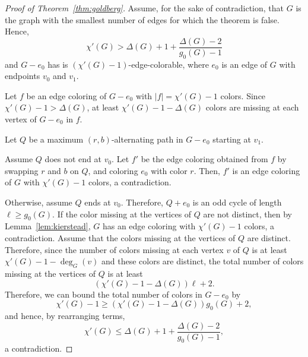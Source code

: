 \begin{proof}[Proof of Theorem~\ref{thm:goldberg}]
    Assume, for the sake of contradiction, that \(G\) is the graph with the smallest number of edges for which the theorem is false.
    Hence,
    \begin{equation}
        \chi'(G) > \Delta(G) + 1 + \frac{\Delta(G) - 2}{g_0(G) - 1}
    \end{equation}
    and \(G - e_0\) has is \((\chi'(G) - 1)\)-edge-colorable,
    where \(e_0\) is an edge of \(G\) with endpoints \(v_0\) and \(v_1\).

    Let \(f\) be an edge coloring of \(G - e_0\) with \(|f| = \chi'(G) - 1\) colors.
    Since \(\chi'(G) - 1 > \Delta(G)\),
    at least \(\chi'(G) - 1 - \Delta(G)\) colors are missing at each vertex of \(G - e_0\) in \(f\).

    Let \(Q\) be a maximum \((r, b)\)-alternating path in \(G - e_0\) starting at \(v_1\).

    Assume \(Q\) does not end at \(v_0\).
    Let \(f'\) be the edge coloring obtained from \(f\) by swapping \(r\) and \(b\) on \(Q\),
    and coloring \(e_0\) with color \(r\).
    Then, \(f'\) is an edge coloring of \(G\) with \(\chi'(G) - 1\) colors, a contradiction.

    Otherwise, assume \(Q\) ends at \(v_0\).
    Therefore, \(Q + e_0\) is an odd cycle of length \(\ell \geq g_0(G)\).
    If the color missing at the vertices of \(Q\) are not distinct,
    then by Lemma~\ref{lem:kierstead},
    \(G\) has an edge coloring with \(\chi'(G) - 1\) colors, a contradiction.
    Assume that the colors missing at the vertices of \(Q\) are distinct.
    Therefore, since the number of colors missing at each vertex \(v\) of \(Q\) is at least \(\chi'(G) - 1 - \deg_G(v)\)
    and these colors are distinct,
    the total number of colors missing at the vertices of \(Q\) is at least
    \begin{equation}
        (\chi'(G) - 1 - \Delta(G)) \ell + 2.
    \end{equation}
    Therefore, we can bound the total number of colors in \(G - e_0\) by
    \begin{equation}
        \chi'(G) - 1 \geq (\chi'(G) - 1 - \Delta(G)) g_0(G) + 2,
    \end{equation}
    and hence, by rearranging terms,
    \begin{equation}
        \chi'(G) \leq \Delta(G) + 1 + \frac{\Delta(G) - 2}{g_0(G) - 1},
    \end{equation}
    a contradiction.
\end{proof}

